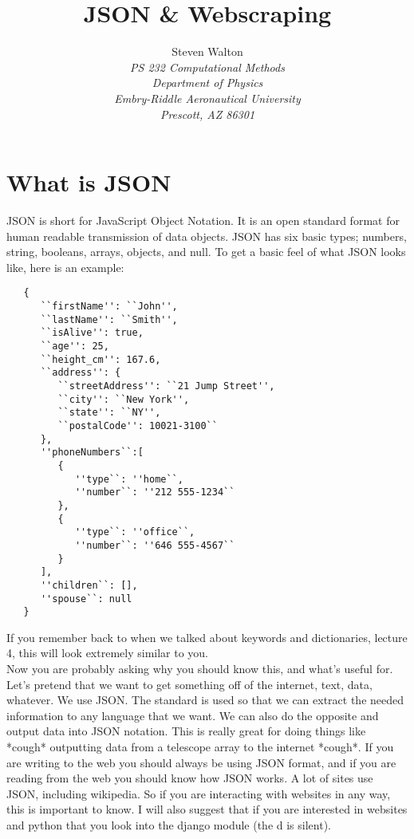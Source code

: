 \documentclass[11pt]{article}   %
\title{JSON & Webscraping}
\author{Steven Walton\\     %
\textit{PS 232 Computational Methods}\\
\textit{Department of Physics}\\
\textit{Embry-Riddle Aeronautical University}\\
\textit{Prescott, AZ   86301}}
\begin{document}
\maketitle
\section*{What is JSON}
JSON is short for JavaScript Object Notation.  It is an open standard format for human readable transmission of data objects.  JSON has six basic types; numbers, string, booleans, arrays, objects, and null.  To get a basic feel of 
what JSON looks like, here is an example:
\begin{tcolorbox}
   \begin{lstlisting}
   {
      ``firstName'': ``John'',
      ``lastName'': ``Smith'',
      ``isAlive'': true,
      ``age'': 25,
      ``height_cm'': 167.6,
      ``address'': {
         ``streetAddress'': ``21 Jump Street'',
         ``city'': ``New York'',
         ``state'': ``NY'',
         ``postalCode'': 10021-3100``
      },
      ''phoneNumbers``:[
         {
            ''type``: ''home``,
            ''number``: ''212 555-1234``
         },
         {
            ''type``: ''office``,
            ''number``: ''646 555-4567``
         }
      ],
      ''children``: [],
      ''spouse``: null
   }
   \end{lstlisting}
\end{tcolorbox}
If you remember back to when we talked about keywords and dictionaries, lecture 4, this will look extremely similar to you.
\\
Now you are probably asking why you should know this, and what's useful for.  Let's pretend that we want to get something off of the internet, text, data, whatever.  We use JSON.  The standard is used so that we can extract the needed
information to any language that we want.  We can also do the opposite and output data into JSON notation.  This is really great for doing things like *cough* outputting data from a telescope array to the internet *cough*.
If you are writing to the web you should always be using JSON format, and if you are reading from the web you should know how JSON works.  A lot of sites use JSON, including wikipedia.  So if you are interacting with websites in 
any way, this is important to know. I will also suggest that if you are interested in websites and python that you look into the django module (the d is silent).
\end{document}
